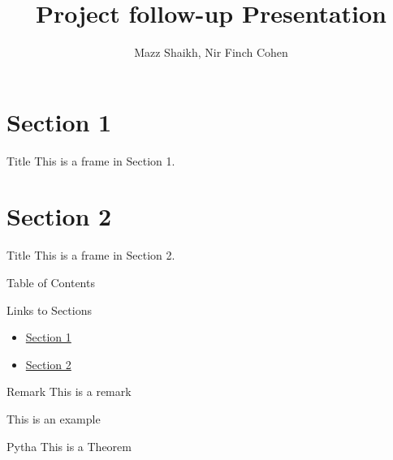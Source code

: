 \documentclass{beamer}
\title{Project follow-up Presentation}
\date{}
\author{Mazz Shaikh, Nir Finch Cohen}
\institute{Designing Oscillator for an Antenna at \(\sim\)3.5 GHz}
\begin{document}
\maketitle

\section{Section 1}
\label{sec:section1}

\begin{frame}{Title}
This is a frame in Section 1.
\end{frame}

\section{Section 2}
\label{sec:section2}

\begin{frame}{Title}
This is a frame in Section 2.
\end{frame}


\begin{frame}{Table of Contents}
\tableofcontents
\end{frame}

\begin{frame}{Links to Sections}
\begin{itemize}
    \item \hyperlink{sec:section1}{Section 1}
    \item \hyperlink{sec:section2}{Section 2}
\end{itemize}
\end{frame}

\begin{frame}
  \begin{block}{Remark}
    This is a remark
  \end{block}

  \begin{example}
    This is an example
  \end{example}
  
  \begin{theorem}{Pytha}
    This is a Theorem
  \end{theorem}

\end{frame}
\end{document}
